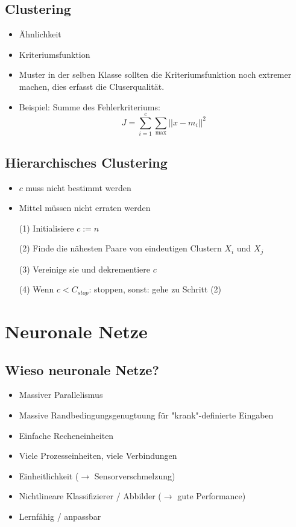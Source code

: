 \subsection{Clustering}

\begin{itemize}
\item Ähnlichkeit
\item Kriteriumsfunktion
\item Muster in der selben Klasse sollten die Kriteriumsfunktion noch extremer machen, dies erfasst die Cluserqualität.
\item Beispiel: Summe des Fehlerkriteriums: $$J = \sum\limits_{i=1}^c \sum\limits_{\max} || x - m_i ||^2$$
\end{itemize}

\subsection{Hierarchisches Clustering}

\begin{itemize}
\item $c$ muss nicht bestimmt werden
\item Mittel müssen nicht erraten werden
\item[(1)] Initialisiere $c := n$
\item[(2)] Finde die nähesten Paare von eindeutigen Clustern $X_i$ und $X_j$
\item[(3)] Vereinige sie und dekrementiere $c$
\item[(4)] Wenn $c < C_{stop}$: stoppen, sonst: gehe zu Schritt (2)
\end{itemize}

\section{Neuronale Netze}

\subsection{Wieso neuronale Netze?}

\begin{itemize}
\item Massiver Parallelismus
\item Massive Randbedingungsgenugtuung für "{}krank"{}-definierte Eingaben
\item Einfache Recheneinheiten
\item Viele Prozesseinheiten, viele Verbindungen
\item Einheitlichkeit ($\to$ Sensorverschmelzung)
\item Nichtlineare Klassifizierer / Abbilder ($\to$ gute Performance)
\item Lernfähig / anpassbar
\end{itemize}

